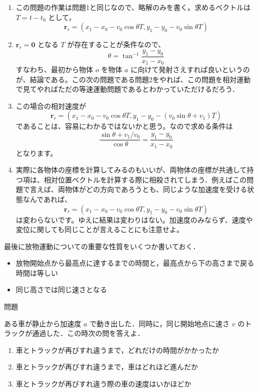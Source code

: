 \documentclass[
  b4paperpaper,
  xelatex,ja=standard]{bxjsbook}
\providecommand{\tightlist}{%
  \setlength{\itemsep}{0pt}\setlength{\parskip}{0pt}}\usepackage{longtable,booktabs,array}
\begin{document}
\begin{enumerate}
\item
  この問題の作業は問題1と同じなので、略解のみを書く。求めるベクトルは
  \(T=t-t_0\) として，
  \[\boldsymbol{r}_r=(x_1-x_0-v_0\cos\theta T,y_1-y_0-v_0\sin\theta T)\]
\item
  \(\boldsymbol{r}_r=\boldsymbol{0}\) となる \(T\)
  が存在することが条件なので、
  \[\theta = \tan ^{-1} \frac{y_1-y_0}{x_1-x_0}\] すなわち、最初から物体
  \(o\) を物体 \(a\)
  に向けて発射さえすれば良いというのが、結論である。この次の問題である問題2をやれば、この問題を相対運動で見てやればただの等速運動問題であるとわかっていただけるだろう．
\item
  この場合の相対速度が
  \[\boldsymbol{r}_r=(x_1-x_0-v_0\cos\theta T,y_1-y_0-(v_0\sin\theta +v_1) T)\]
  であることは、容易にわかるではないかと思う。なので求める条件は
  \[\frac{\sin\theta + v_1/v_0}{\cos\theta} = \frac{y_1-y_0}{x_1-x_0}\]
  となります。
\item
  実際に各物体の座標を計算してみるのもいいが、両物体の座標が共通して持つ項は、相対位置ベクトルを計算する際に相殺されてしまう．例えばこの問題で言えば、両物体がどの方向であろうとも、同じような加速度を受ける状態なんであれば、
  \[\boldsymbol{r}_r=(x_1-x_0-v_0\cos\theta T,y_1-y_0-v_0\sin\theta T)\]
  は変わらないです。ゆえに結果は変わりはない。加速度のみならず、速度や変位に関しても同じことが言えることにも注意せよ。
\end{enumerate}

最後に放物運動についての重要な性質をいくつか書いておく．

\begin{itemize}
\tightlist
\item
  放物開始点から最高点に達するまでの時間と，最高点から下の高さまで戻る時間は等しい
\item
  同じ高さでは同じ速さとなる
\end{itemize}

\begin{Qbox}{問題}

ある車が静止から加速度 \(a\) で動き出した．同時に，同じ開始地点に速さ
\(v\) のトラックが通過した．この時次の問を答えよ．

\begin{enumerate}
\def\labelenumi{\arabic{enumi}.}
\item
  車とトラックが再びすれ違うまで，どれだけの時間がかかったか
\item
  車とトラックが再びすれ違うまで，車はどれほど進んだか
\item
  車とトラックが再びすれ違う際の車の速度はいかほどか
\end{enumerate}

\end{Qbox}
\end{document}
